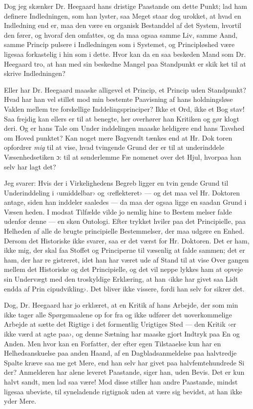 \documentclass[12pt,a4paper,openany]{book}
\newcommand{\opage}[1]{\marginnote{\footnotesize\textit{[#1]}}}
\begin{document}
Dog jeg skænker Dr. Heegaard hans dristige Paastande om
dette Punkt; lad ham definere Indledningen, som han lyster,
saa Meget staar dog urokket, at hvad en Indledning end er,
maa den være en organisk Bestanddel af det System, hvortil
den fører, og hvoraf den omfattes, og da maa ogsaa samme
Liv, samme Aand, samme Princip pulsere i Indledningen som i
Systemet, og Principløshed være ligesaa forkastelig i hin som i
dette. Hvor kan da en saa beskeden Mand som Dr. Heegaard
tro, at han med sin beskedne Mangel paa Standpunkt er skik\-%
ket til at skrive Indledningen?

Eller har Dr. Heegaard maaske alligevel et Princip, et
\opage{38}Princip uden Standpunkt? Hvad har han vel stillet mod
min bestemte Paavisning af hans holdningsløse Vaklen mellem
tre forskellige Inddelingsprinciper? Ikke et Ord, ikke et Bog\-%
stav! Saa frejdig kan ellers er til at benegte, her overhører
han Kritiken og gør klogt deri. Og er hans Tale om Under\-%
inddelingen maaske heldigere end hans Tavshed om Hoved\-%
punktet? Kan noget mere Bagvendt tænkes end at Hr. Dok\-%
toren opfordrer \emph{mig} til at vise, hvad tvingende Grund der er
til at underinddele Væsenhedsetiken ɔ: til at sønderlemme Fæ\-%
nomenet over det Hjul, hvorpaa han selv har lagt det?

Jeg svarer: Hvis der i Virkelighedens Begreb ligger en tvin\-%
gende Grund til Underinddeling i ‹umiddelbar› og ‹reflekteret›
--- og det maa vel Hr. Doktoren antage, siden han inddeler
saaledes --- da maa der ogsaa ligge en saadan Grund i Væsen\-%
heden. I modsat Tilfælde vilde jo nemlig hine to Bestem\-%
melser falde udenfor denne --- en skøn Ontologi. Efter\-%
trykket hviler paa det Principielle, paa Helheden af alle de
brugte principielle Bestemmelser, der maa udgøre en Enhed.
Dersom det Historiske ikke svarer, saa er det værst for Hr.
Doktoren. Det er ham, ikke mig, der skal faa Stoffet og
Principerne til væsenlig at falde sammen; det er ham, der har re\-%
gistreret, idet han har været ude af Stand til at vise Over\-%
gangen mellem det Historiske og det Principielle, og det vil
neppe lykkes ham at opveje sin Undervægt med den troskyldige
Erklæring, at han ‹ikke har givet saa Lidt endda af Prin\-%
cipudvikling›. Det bliver ikke vissere, fordi han selv for\-%
sikrer det.

Dog, Dr. Heegaard har jo erklæret, at en Kritik af hans
Arbejde, der som min ikke tager alle Spørgsmaalene op for\-%
fra og ikke udfører det uoverkommelige Arbejde at sætte det
Rigtige i det formentlig Urigtiges Sted --- den Kritik ‹er ikke værd
at agte paa›, og denne Sætning har maaske gjort Indtryk paa
En og Anden. Men hvor kan en Forfatter, der efter egen
Tilstaaelse kun har en Helhedsanskuelse paa anden Haand, af
en Dagbladsanmeldelse paa halvtredje Spalte kræve saa me\-%
get Mere, end han selv har givet paa halvfemtehundrede Si\-%
der? Anmelderen har alene leveret Paastande, siger han,
uden Bevis. Det er kun halvt sandt, men lad saa være! Mod
disse stiller han andre Paastande, mindst ligesaa ubeviste, til%
\opage{39}syneladende rigtignok uden at være sig bevidst, at han ikke
yder Mere.
\end{document}
